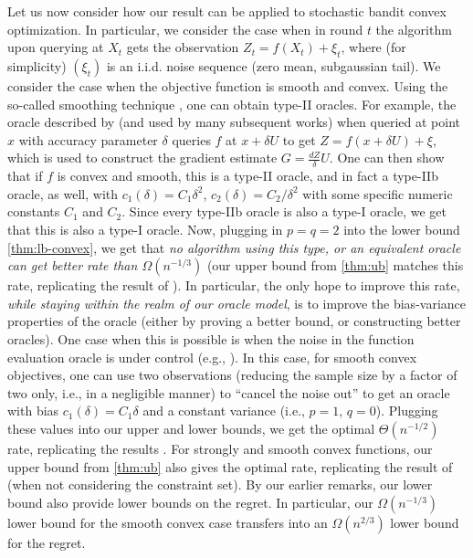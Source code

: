 Let us now consider how our result can be applied to stochastic bandit convex optimization. 
In particular, we consider the case when in round $t$ the algorithm upon querying at $X_t$ gets
the observation $Z_t = f(X_t) + \xi_t$, where (for simplicity) $(\xi_t)$ is an i.i.d. noise sequence (zero mean, subgaussian tail).
We consider the case when the objective function is smooth and convex.
Using the so-called smoothing technique \citep{PoTsy90,flaxman2005online,HaLe14:SOC}, one can obtain
type-II oracles. For example, the oracle described by \citet{flaxman2005online} (and used by many subsequent works)
when queried at point $x$ with accuracy parameter $\delta$ queries $f$ at $x+\delta U$ to get
$Z=f(x+\delta U)+\xi$, which is used to construct the gradient estimate $G = \frac{d Z}{\delta} U$.
One can then show that if $f$ is convex and smooth, this is a type-II oracle, and in fact a type-IIb oracle, as well, with 
$c_1(\delta)=C_1 \delta^2$, $c_2(\delta) = C_2/\delta^2$ with some specific numeric constants $C_1$ and $C_2$.
Since every type-IIb oracle is also a type-I oracle, we get that this is also a type-I oracle.
Now, plugging in $p=q=2$ into the lower bound \cref{thm:lb-convex}, we get that \emph{no algorithm using this type, or an
equivalent oracle can get better rate than $\Omega(n^{-1/3})$} (our upper bound from \cref{thm:ub} matches this rate,
replicating the result of \citet{saha2011improved}).
In particular, the only hope to improve this rate, \emph{while staying within the realm of our oracle model}, is to improve the bias-variance properties of the oracle (either by proving a better bound, or constructing better oracles).
One case when this is possible is when the noise in the function evaluation oracle is under control
(e.g., \citep{Ne11:TR,duchi2015optimal}).
In this case, for smooth convex objectives, 
one can use two observations (reducing the sample size by a factor of two only, i.e., in a negligible manner) 
to ``cancel the noise out''  to get an oracle with bias $c_1(\delta) = C_1\delta$ 
and a constant variance (i.e., $p=1$, $q=0$). Plugging these values into our upper and lower bounds, we get the optimal $\Theta(n^{-1/2})$ rate, replicating the results \citet{Ne11:TR,duchi2015optimal}.
For strongly and smooth convex functions, our upper bound from  \cref{thm:ub}  also gives the optimal rate,
replicating the result of \citet{HaLe14:SOC} (when not considering the constraint set).
By our earlier remarks, our lower bound also provide lower bounds on the regret. In particular,
our $\Omega(n^{-1/3})$ lower bound for the smooth convex case transfers into an $\Omega(n^{2/3})$ lower bound
for the regret.

